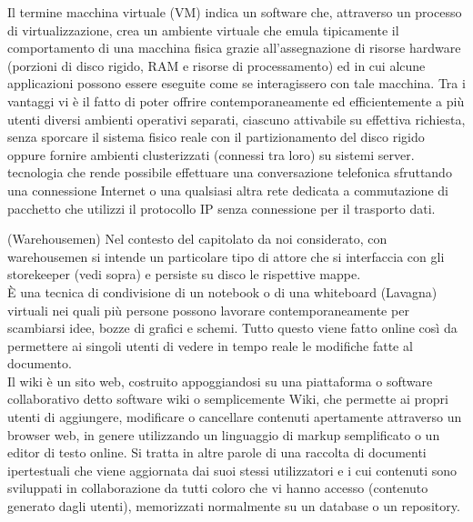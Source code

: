 \documentclass{scalatekids-article}
\begin{document}
   Il termine macchina virtuale (VM) indica un software che, attraverso un processo di virtualizzazione, crea un ambiente virtuale che emula tipicamente il comportamento di una macchina fisica grazie all'assegnazione di risorse hardware (porzioni di disco rigido, RAM e risorse di processamento) ed in cui alcune applicazioni possono essere eseguite come se interagissero con tale macchina.
  Tra i vantaggi vi è il fatto di poter offrire contemporaneamente ed efficientemente a più utenti diversi ambienti operativi separati, ciascuno attivabile su effettiva richiesta, senza sporcare il sistema fisico reale con il partizionamento del disco rigido oppure fornire ambienti clusterizzati (connessi tra loro) su sistemi server.
  \\

   tecnologia che rende possibile effettuare una conversazione telefonica sfruttando una connessione Internet o una qualsiasi altra rete dedicata a commutazione di pacchetto che utilizzi il protocollo IP senza connessione per il trasporto dati.
  \\

  
  \glossDef(Warehousemen) Nel contesto del capitolato da noi considerato, con warehousemen si intende un particolare tipo di attore che si interfaccia con gli storekeeper (vedi sopra) e persiste su disco le rispettive mappe.
  \\

   È una tecnica di condivisione di un notebook o di una whiteboard (Lavagna) virtuali nei quali più persone possono lavorare contemporaneamente per scambiarsi idee, bozze di grafici e schemi.
  Tutto questo viene fatto online così da permettere ai singoli utenti di vedere in tempo reale le modifiche fatte al documento.
  \\

   Il wiki è un sito web, costruito appoggiandosi su una piattaforma o software collaborativo detto software wiki o semplicemente Wiki, che permette ai propri utenti di aggiungere, modificare o cancellare contenuti apertamente attraverso un browser web, in genere utilizzando un linguaggio di markup semplificato o un editor di testo online.
  Si tratta in altre parole di una raccolta di documenti ipertestuali che viene aggiornata dai suoi stessi utilizzatori e i cui contenuti sono sviluppati in collaborazione da tutti coloro che vi hanno accesso (contenuto generato dagli utenti), memorizzati normalmente su un database o un repository.
  \\



\end{document}
